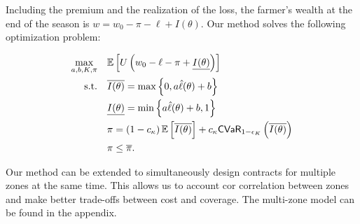 \documentclass[12pt]{article}
\begin{document}

Including the premium and the realization of the loss, the farmer's wealth at the end of the season is $w = w_0 -\pi - \ell + I(\theta)$. Our method solves the following optimization problem: 

\begin{align}
    \max_{a,b,K,\pi} &\quad \mathbb{E} \left [  U\left(w_0 - \ell - \pi  +  \underline{I(\theta)} \right) \right ]\label{eq-06}\\
    \text{s.t.} & \quad \overline{I(\theta)} = \max \left \{0,a\hat{\ell}(\theta) + b \right \} \nonumber\\
    & \quad \underline{I(\theta)} = \min \left \{a\hat{\ell}(\theta)+b,1 \right \} \nonumber\\
    & \quad \pi = \left (1-c_{\kappa} \right ) \mathbb{E} \left [ \overline{I(\theta)} \right ] + c_{\kappa} {\sf CVaR}_{1-\epsilon_K} \left( \overline{I(\theta)} \right) \label{eq-41}\\
    & \quad \pi \leq \overline{\pi} \nonumber.
\end{align}

Our method can be extended to simultaneously design contracts for multiple zones at the same time. This allows us to account cor correlation between zones and make better trade-offs between cost and coverage. The multi-zone model can be found in the appendix. \\



\end{document}

